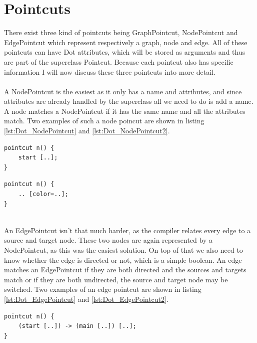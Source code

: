 \documentclass[a4paper]{report}
\begin{document}
\section{Pointcuts}
There exist three kind of pointcuts being GraphPointcut, NodePointcut and EdgePointcut which represent respectively a graph, node and edge. All of these pointcuts can have Dot attributes, which will be stored as arguments and thus are part of the superclass Pointcut. Because each pointcut also has specific information I will now discuss these three pointcuts into more detail.\\
\\
A NodePointcut is the easiest as it only has a name and attributes, and since attributes are already handled by the superclass all we need to do is add a name. A node matches a NodePointcut if it has the same name and all the attributes match. Two examples of such a node poincut are shown in listing \ref{lst:Dot_NodePointcut} and \ref{lst:Dot_NodePointcut2}.\\
\begin{minipage}{0.45\textwidth}
\begin{lstlisting}[caption=A node pointcut matching any node start, label=lst:Dot_NodePointcut]
pointcut n() {
	start [..];
}
\end{lstlisting}
\end{minipage}\hfill
\begin{minipage}{0.45\textwidth}
\begin{lstlisting}[caption=A node pointcut matching any node with only a color, label=lst:Dot_NodePointcut2]
pointcut n() {
	.. [color=..];
}
\end{lstlisting}
\end{minipage}
\\
An EdgePointcut isn't that much harder, as the compiler relates every edge to a source and target node. These two nodes are again represented by a NodePointcut, as this was the easiest solution. On top of that we also need to know whether the edge is directed or not, which is a simple boolean. An edge matches an EdgePointcut if they are both directed and the sources and targets match or if they are both undirected, the source and target node may be switched. Two examples of an edge pointcut are shown in listing \ref{lst:Dot_EdgePointcut} and \ref{lst:Dot_EdgePointcut2}.\\
\begin{minipage}{0.45\textwidth}
\begin{lstlisting}[caption=An edge pointcut matching any edge from start to main, label=lst:Dot_EdgePointcut]
pointcut n() {
	(start [..]) -> (main [..]) [..];
}
\end{lstlisting}
\end{minipage}\hfill
\end{document}
